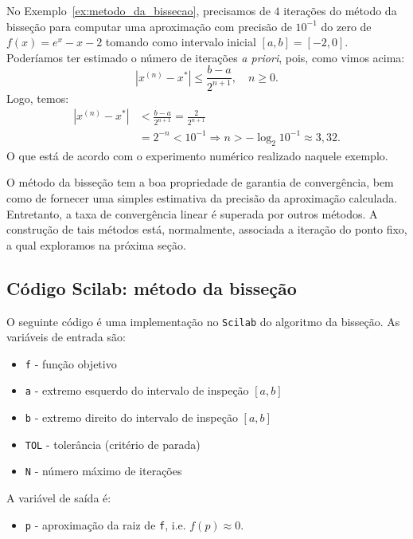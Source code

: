 \begin{ex}No Exemplo~\ref{ex:metodo_da_bissecao}, precisamos de $4$ iterações do método da bisseção para computar uma aproximação com precisão de $10^{-1}$ do zero de $f(x) = e^x - x - 2$ tomando como intervalo inicial $[a, b] = [-2, 0]$. Poderíamos ter estimado o número de iterações \emph{a priori}, pois, como vimos acima:
  \begin{equation*}
    |x^{(n)}-x^*|\leq \frac{b-a}{2^{n+1}},\quad n\geq 0.
  \end{equation*}
Logo, temos:
\begin{align*}
  |x^{(n)} - x^*| &< \frac{b - a}{2^{n+1}} = \frac{2}{2^{n+1}}\\
  &= 2^{-n} < 10^{-1} \Rightarrow  n > -\log_2 10^{-1} \approx 3,32.
\end{align*}
O que está de acordo com o experimento numérico realizado naquele exemplo.
\end{ex}

O método da bisseção tem a boa propriedade de garantia de convergência, bem como de fornecer uma simples estimativa da precisão da aproximação calculada. Entretanto, a taxa de convergência linear é superada por outros métodos. A construção de tais métodos está, normalmente, associada a iteração do ponto fixo, a qual exploramos na próxima seção.

\ifisscilab
\subsection{Código Scilab: método da bisseção}

O seguinte código é uma implementação no \verb+Scilab+ do algoritmo da bisseção. As variáveis de entrada são:
\begin{itemize}
\item \verb+f+ - função objetivo
\item \verb+a+ - extremo esquerdo do intervalo de inspeção $[a, b]$
\item \verb+b+ - extremo direito do intervalo de inspeção $[a, b]$
\item \verb+TOL+ - tolerância (critério de parada)
\item \verb+N+ - número máximo de iterações
\end{itemize}
A variável de saída é:
\begin{itemize}
\item \verb+p+ - aproximação da raiz de \verb+f+, i.e. $f(p) \approx 0$.
\end{itemize}

